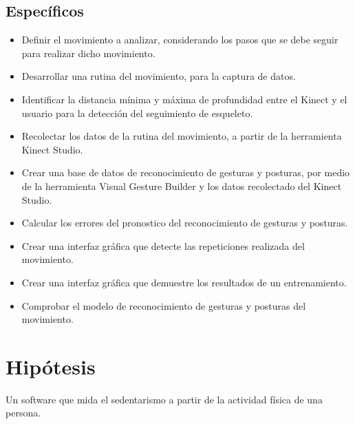 \documentclass[twoside,twocolumn]{article}
\begin{document}
\subsection{Específicos}
\begin{itemize}
\item Definir el movimiento a analizar, considerando los pasos que se debe seguir para realizar dicho movimiento.
\item Desarrollar una rutina del movimiento, para la captura de datos.
\item Identificar la distancia mínima y máxima de profundidad entre el Kinect y el usuario para la detección del seguimiento de esqueleto.
\item Recolectar los datos de la rutina del movimiento, a partir de la herramienta Kinect Studio.
\item Crear una base de datos de reconocimiento de gesturas y posturas,  por medio de la herramienta Visual Gesture Builder y los datos recolectado del Kinect Studio.
\item Calcular los errores del pronostico del reconocimiento de gesturas y posturas.
\item Crear una interfaz gráfica que detecte las repeticiones realizada del movimiento.
\item Crear una interfaz gráfica que demuestre los resultados de un entrenamiento.
\item Comprobar el modelo de reconocimiento de gesturas y posturas del movimiento.
\end{itemize}
\section{Hipótesis}
Un software que mida el sedentarismo a partir de la actividad física de una persona.
\end{document}
